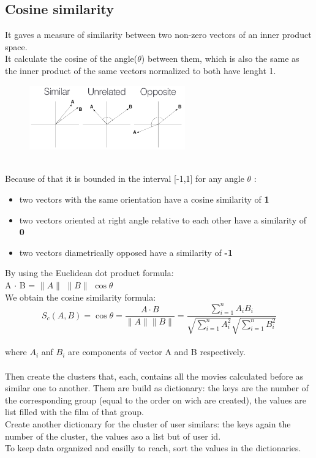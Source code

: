 \documentclass{article}
\begin{document}
\subsection{Cosine similarity}
It gaves a measure of similarity between two non-zero vectors of an inner product space.\\It calculate the cosine of the angle($\theta$) between them, which is also the same as the inner product of the same vectors normalized to both have lenght 1. \\
\begin{figure}[ht]
      \begin{center}
            \includegraphics[width=0.6\textwidth]{images/cosine.png}
      \end{center}
\end{figure}\\
Because of that it is bounded in the interval [-1,1] for any angle $\theta$ :
\begin{itemize}
      \item two vectors with the same orientation have a cosine similarity of \textbf{1}
      \item two vectors oriented at right angle relative to each other have a similarity of \textbf{0}
      \item two vectors diametrically opposed have a similarity of \textbf{-1}
\end{itemize}
By using the Euclidean dot product formula:\\
A $\cdot$ B = $\|A\|$ $\|B\|$ $\cos\theta$ \\
We obtain the cosine similarity formula:\\
\begin{equation}
      S_c(A,B) = \cos\theta = \frac{A \cdot B}{\|A\| \|B\|} = \frac{\sum_{i=1}^n A_i B_i}{\sqrt{\sum_{i=1}^n A_i^2}\sqrt{\sum_{i=1}^n B_i^2}}
\end{equation}\\
where $A_i$ anf $B_i$ are components of vector A and B respectively.\\ \\
Then create the clusters that, each, contains all the movies calculated before as similar one to another. 
Them are build as dictionary: the keys are the number of the corresponding group (equal to the order on wich are created), the values are list filled with the film of that group.\\
Create another dictionary for the cluster of user similars: the keys again the number of the cluster, the values aso a list but of user id. \\
To keep data organized and easilly to reach, sort the values in the dictionaries.\\
\end{document}
